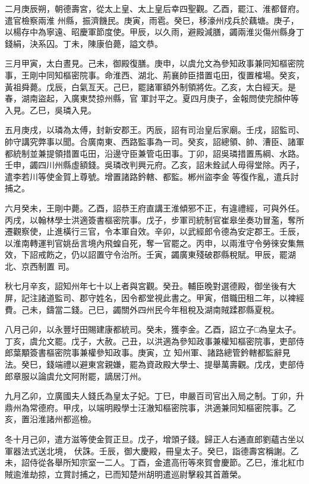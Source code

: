 \begin{pinyinscope}
 二月庚辰朔，朝德壽宮，從太上皇、太上皇后幸四聖觀。乙酉，罷江、淮都督府。遣官檢察兩淮
 州縣，振濟饑民。庚寅，雨雹。癸巳，移濠州戍兵於藕塘。庚子，以楊存中為寧遠、昭慶軍節度使。甲辰，以久雨，避殿減膳，蠲兩淮災傷州縣身丁錢絹，決系囚。丁未，陳康伯薨，謚文恭。



 三月甲寅，太白晝見。己未，御殿復膳。庚申，以虞允文為參知政事兼同知樞密院事，王剛中同知樞密院事。命淮西、湖北、荊襄帥臣措置屯田，復置榷場。癸亥，黃祖舜薨。戊辰，白氣亙天。己巳，罷諸軍額外制領將佐。乙亥，太白經天。是春，湖南盜起，入廣東焚掠州縣，官
 軍討平之。夏四月庚子，金報問使完顏仲等入見。乙巳，吳璘入見。



 五月庚戌，以璘為太傅，封新安郡王。丙辰，詔有司治皇后家廟。壬戌，詔監司、帥守講究弊事以聞。合廣南東、西路監事為一司。癸亥，詔總領、帥、漕臣、諸軍都統制並兼提領措置屯田，沿邊守臣兼管屯田事。丁卯，詔吳璘措置馬綱、水路。壬申，蠲四川州縣虛額錢。吳璘改判興元府。乙亥，詔未銓試人毋得堂除。丙子，遣李若川等使金賀上尊號。增置諸路鈐轄、都監。郴州盜李金
 等復作亂，遣兵討捕之。



 六月癸未，王剛中薨。乙酉，詔恭王府直講王淮傾邪不正，有違禮經，可與外任。丙戌，以翰林學士洪適簽書樞密院事。戊子，步軍司統制官崔皋坐奏功冒濫，奪所遷觀察使，止進橫行三官，令本軍自效。辛卯，以武經郎令德為安定郡王。壬辰，以淮南轉運判官姚岳言境內飛蝗自死，奪一官罷之。丙申，以兩淮守令勞徠安集無效，下詔戒飭之，仍以詔置守令治所。壬寅，蠲廣東殘破郡縣稅賦。甲辰，罷湖北、京西制置
 司。



 秋七月辛亥，詔知州年七十以上者與宮觀。癸丑。輔臣晚對選德殿，御坐後有大屏，記注諸道監司、郡守姓名，因令都堂視此書之。甲寅，借職田租二年，以裨經費。己未，鑄當二錢。己巳，蠲關外四州民今年租稅及湖南賊蹂郡縣夏稅。



 八月己卯，以永豐圩田賜建康都統司。癸未，獲李金。乙酉，詔立子□為皇太子。丁亥，虞允文罷。戊子，大赦。己丑，以洪適為參知政事兼權知樞密院事，吏部侍郎葉顒簽書樞密院事兼權參知政事。庚寅，立
 知州軍、諸路總管鈐轄都監辭見法。癸巳，錢端禮以避東宮親嫌，罷為資政殿大學士、提舉萬壽觀。戊戌，吏部侍郎章服以論虞允文阿附罷，謫居汀州。



 九月乙卯，立廣國夫人錢氏為皇太子妃。丁巳，申嚴百司官出入局之制。丁卯，升鼎州為常德府。甲戌，以端明殿學士汪澈知樞密院事，洪適兼同知樞密院事。乙亥，置沿淮諸州都巡檢。



 冬十月己卯，遣方滋等使金賀正旦。戊子，增頭子錢。歸正人右通直郎劉蘊古坐以軍器法式送北境，
 伏誅。壬辰，御大慶殿，冊皇太子。癸巳，詣德壽宮稱謝。乙未，詔侍從各舉所知宗室一二人。丁酉，金遣高衎等來賀會慶節。乙巳，淮北紅巾賊逾淮劫掠，立賞討捕之，已而知楚州胡明遣巡尉擊殺其首蕭榮。




\end{pinyinscope}
